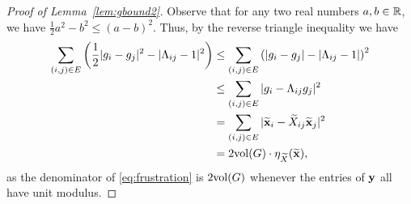 \begin{proof}[Proof of Lemma~\ref{lem:gbound2}]
  Observe that for any two real numbers $a, b \in \mathbb{R}$, we have $\frac{1}{2} a^2 - b^2 \le (a - b)^2$. Thus, by the reverse triangle inequality we have
  \begin{equation}
    \begin{aligned}
      \sum_{(i, j) \in E}  \left(\frac{1}{2} |g_i - g_j|^2 - |\Lambda_{ij} - 1|^2\right)
      &\le \sum_{(i, j) \in E}  \left( |g_i - g_j| - |\Lambda_{ij} - 1|\right)^2 \\
      &\le \sum_{(i, j) \in E}  |g_i - \Lambda_{ij}g_j|^2 \\
      &= \sum_{(i, j) \in E}  |\widetilde{\mathbf x}_i - \widetilde{X}_{ij} \widetilde{\mathbf x}_j |^2 \\
      &= 2 \mathrm{vol}(G) \cdot \eta_{\widetilde{X}}(\widetilde{\mathbf x}),
    \end{aligned}
    \label{eq:gi_to_frustration}
  \end{equation}
%
as the denominator of \eqref{eq:frustration} is $2\mathrm{vol}(G)$ whenever the entries of ${\bf y}$ all have unit modulus.


\end{proof}
